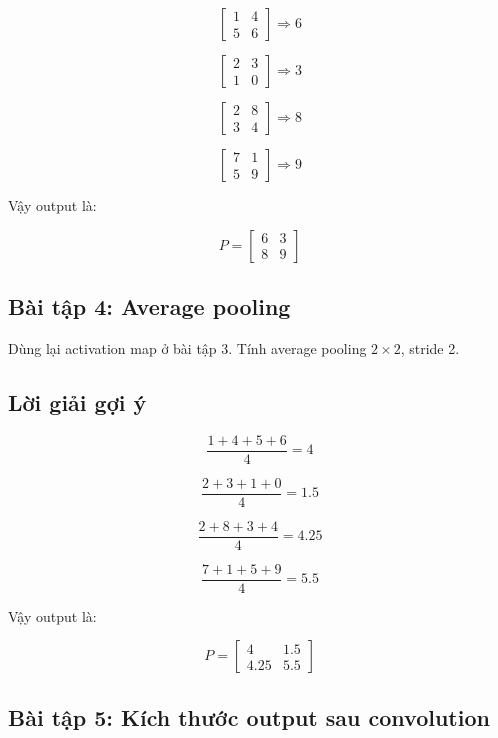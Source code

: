 \[
    \begin{bmatrix}
    1 & 4\\
    5 & 6
    \end{bmatrix}
    \Rightarrow 6
\]

\[
    \begin{bmatrix}
    2 & 3\\
    1 & 0
    \end{bmatrix}
    \Rightarrow 3
\]

\[
    \begin{bmatrix}
    2 & 8\\
    3 & 4
    \end{bmatrix}
    \Rightarrow 8
\]

\[
    \begin{bmatrix}
    7 & 1\\
    5 & 9
    \end{bmatrix}
    \Rightarrow 9
\]

Vậy output là:

\[
    P =
    \begin{bmatrix}
    6 & 3\\
    8 & 9
    \end{bmatrix}
\]

\subsection*{Bài tập 4: Average pooling}

Dùng lại activation map ở bài tập 3. Tính average pooling $2\times2$, stride 2.

\subsection*{Lời giải gợi ý}

\[
    \frac{1+4+5+6}{4}=4
\]

\[
    \frac{2+3+1+0}{4}=1.5
\]

\[
    \frac{2+8+3+4}{4}=4.25
\]

\[
    \frac{7+1+5+9}{4}=5.5
\]

Vậy output là:

\[
    P =
    \begin{bmatrix}
    4 & 1.5\\
    4.25 & 5.5
    \end{bmatrix}
\]

\subsection*{Bài tập 5: Kích thước output sau convolution}

